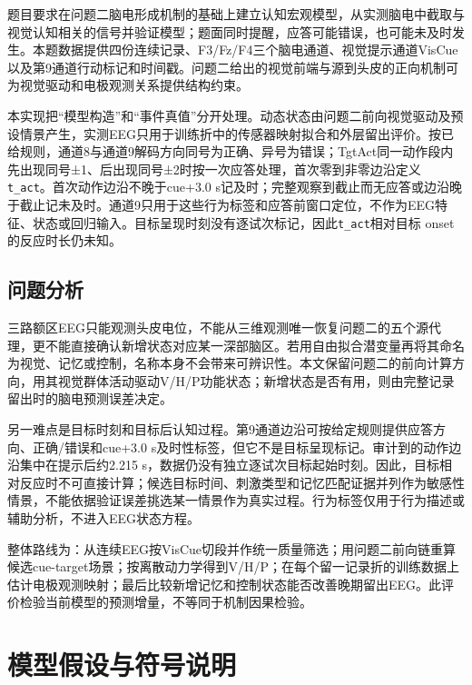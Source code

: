 \documentclass[12pt,a4paper]{article}
\begin{document}
题目要求在问题二脑电形成机制的基础上建立认知宏观模型，从实测脑电中截取与视觉认知相关的信号并验证模型；题面同时提醒，应答可能错误，也可能未及时发生\cite{problem2026}。本题数据提供四份连续记录、F3/Fz/F4三个脑电通道、视觉提示通道VisCue以及第9通道行动标记和时间戳。问题二给出的视觉前端与源到头皮的正向机制可为视觉驱动和电极观测关系提供结构约束。

本实现把``模型构造''和``事件真值''分开处理。动态状态由问题二前向视觉驱动及预设情景产生，实测EEG只用于训练折中的传感器映射拟合和外层留出评价。按已给规则，通道8与通道9解码方向同号为正确、异号为错误；TgtAct同一动作段内先出现同号±1、后出现同号±2时按一次应答处理，首次零到非零边沿定义\texttt{t\_act}。首次动作边沿不晚于cue+3.0 s记及时；完整观察到截止而无应答或边沿晚于截止记未及时。通道9只用于这些行为标签和应答前窗口定位，不作为EEG特征、状态或回归输入。目标呈现时刻没有逐试次标记，因此\texttt{t\_act}相对目标 onset 的反应时长仍未知。

\hypertarget{ux95eeux9898ux5206ux6790}{%
\subsection{问题分析}\label{ux95eeux9898ux5206ux6790}}

三路额区EEG只能观测头皮电位，不能从三维观测唯一恢复问题二的五个源代理，更不能直接确认新增状态对应某一深部脑区。若用自由拟合潜变量再将其命名为视觉、记忆或控制，名称本身不会带来可辨识性。本文保留问题二的前向计算方向，用其视觉群体活动驱动V/H/P功能状态；新增状态是否有用，则由完整记录留出时的脑电预测误差决定。

另一难点是目标时刻和目标后认知过程。第9通道边沿可按给定规则提供应答方向、正确/错误和cue+3.0 s及时性标签，但它不是目标呈现标记。审计到的动作边沿集中在提示后约2.215 s，数据仍没有独立逐试次目标起始时刻。因此，目标相对反应时不可直接计算；候选目标时间、刺激类型和记忆匹配证据并列作为敏感性情景，不能依据验证误差挑选某一情景作为真实过程。行为标签仅用于行为描述或辅助分析，不进入EEG状态方程。

整体路线为：从连续EEG按VisCue切段并作统一质量筛选；用问题二前向链重算候选cue-target场景；按离散动力学得到V/H/P；在每个留一记录折的训练数据上估计电极观测映射；最后比较新增记忆和控制状态能否改善晚期留出EEG。此评价检验当前模型的预测增量，不等同于机制因果检验。

\hypertarget{ux6a21ux578bux5047ux8bbeux4e0eux7b26ux53f7ux8bf4ux660e}{%
\section{模型假设与符号说明}\label{ux6a21ux578bux5047ux8bbeux4e0eux7b26ux53f7ux8bf4ux660e}}
\end{document}
